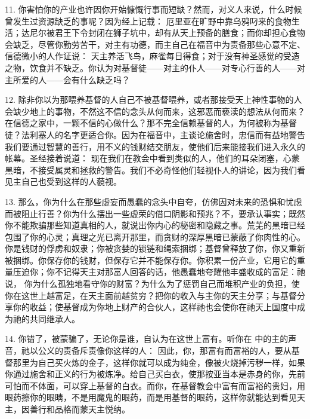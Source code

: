 11. 你害怕你的产业也许因你开始慷慨行事而短缺？然而，对义人来说，什么时候曾发生过资源缺乏的事呢？因为经上记载： 厄里亚在旷野中靠乌鸦叼来的食物生活；达尼尔被君王下令封闭在狮子坑中，却有从天上预备的膳食；而你却担心食物会缺乏，尽管你勤劳苦干，对主有功德，而主自己在福音中为责备那些心意不定、信德微小的人作证说： 天主养活飞鸟，麻雀每日得食；对于没有神圣感觉的受造之物，饮食并不缺乏。你认为对基督徒——对主的仆人——对专心行善的人——对主所爱的人——会有什么缺乏吗？\par

12. 除非你以为那喂养基督的人自己不被基督喂养，或者那接受天上神性事物的人会缺少地上的事物，不然这不信的念头从何而来，这邪恶而亵渎的想法从何而来？在信德之家中，一颗不信的心做什么？那不完全信赖基督的人，为何被称为基督徒？法利塞人的名字更适合你。因为在福音中，主谈论施舍时，忠信而有益地警告我们要通过智慧的善行，用不义的钱财结交朋友，使他们后来能接我们进入永久的帐幕。圣经接着说道： 现在我们在教会中看到类似的人，他们的耳朵闭塞，心蒙黑暗，不接受属灵和拯救的警告。我们不必奇怪他们轻视仆人的讲论，因为我们看见主自己也受到这样的人藐视。\par

13. 那么，你为什么在那些虚妄而愚蠢的念头中自夸，仿佛因对未来的恐惧和忧虑而被阻止行善？你为什么摆出一些虚荣的借口阴影和预兆？不，要承认事实；既然你不能欺骗那些知道真相的人，就说出你内心的秘密和隐藏之事。荒芜的黑暗已经包围了你的心灵；真理之光已离开那里，而贪财的深厚黑暗已蒙蔽了你肉性的心。你是钱财的俘虏和奴隶；你被贪婪的锁链和绳索捆绑；基督曾释放了你，你又重新被捆绑。你保存你的钱财，但保存它并不能保存你。你积累一份产业，它用它的重量压迫你；你不记得天主对那富人回答的话，他愚蠢地夸耀他丰盛收成的富足：祂说， 你为什么孤独地看守你的财富？为什么为了惩罚自己而堆积产业的负担，使你在这世上越富足，在天主面前越贫穷？把你的收入与主你的天主分享；与基督分享你的收益；使基督成为你地上财产的合伙人，这样祂也会使你在祂天上国度中成为祂的共同继承人。\par

14. 你错了，被蒙骗了，无论你是谁，自认为在这世上富有。听你在  中的主的声音，祂以公义的责备斥责像你这样的人： 因此，你，那富有而富裕的人，要从基督那里为自己买火炼的金子，这样你就可以成为纯金，像被火烧掉污秽一样，如果你通过施舍和正义的行为被炼净。给自己买白衣，使那按亚当本是赤身的你，先前可怕而不体面，可以穿上基督的白衣。而你，在基督教会中富有而富裕的贵妇，用眼药擦你的眼睛，不是用魔鬼的眼药，而是用基督的眼药，这样你就能达到看见天主，因善行和品格而蒙天主悦纳。\par

